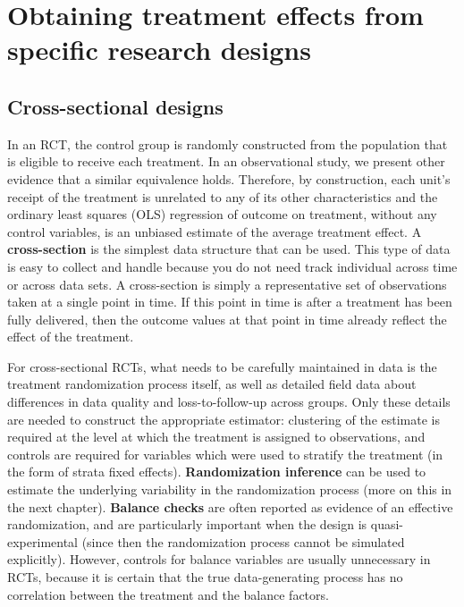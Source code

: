 \section{Obtaining treatment effects from specific research designs}


\subsection{Cross-sectional designs}

In an RCT, the control group is randomly constructed
from the population that is eligible to receive each treatment.
In an observational study, we present other evidence that a similar equivalence holds.
Therefore, by construction, each unit's receipt of the treatment
is unrelated to any of its other characteristics
and the ordinary least squares (OLS) regression
of outcome on treatment, without any control variables,
is an unbiased estimate of the average treatment effect.
A \textbf{cross-section} is the simplest data structure that can be used.
This type of data is easy to collect and handle because
you do not need track individual across time or across data sets.
A cross-section is simply a representative set of observations
taken at a single point in time.
If this point in time is after a treatment has been fully delivered,
then the outcome values at that point in time
already reflect the effect of the treatment.

For cross-sectional RCTs, what needs to be carefully maintained in data
is the treatment randomization process itself,
as well as detailed field data about differences
in data quality and loss-to-follow-up across groups.\cite{athey2017econometrics}
Only these details are needed to construct the appropriate estimator:
clustering of the estimate is required at the level
at which the treatment is assigned to observations,
and controls are required for variables which
were used to stratify the treatment (in the form of strata fixed effects).
\textbf{Randomization inference} can be used
to estimate the underlying variability in the randomization process
(more on this in the next chapter).
\textbf{Balance checks} are often reported as evidence of an effective randomization,
and are particularly important when the design is quasi-experimental
(since then the randomization process cannot be simulated explicitly).
However, controls for balance variables are usually unnecessary in RCTs,
because it is certain that the true data-generating process
has no correlation between the treatment and the balance factors.

